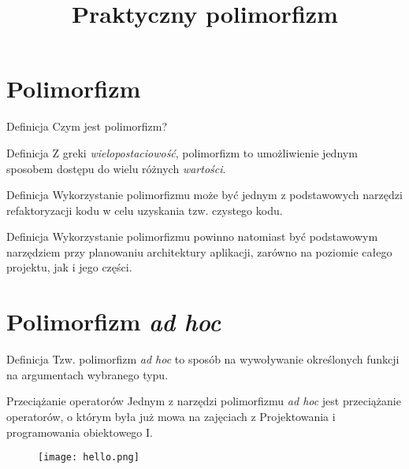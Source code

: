 

\title{Praktyczny polimorfizm}



\section{Polimorfizm}

\begin{frame}{Definicja}
	Czym jest polimorfizm?
\end{frame}

\begin{frame}{Definicja}
	Z greki \emph{wielopostaciowość}, polimorfizm to umożliwienie jednym sposobem dostępu do wielu różnych \emph{wartości}.
\end{frame}

\begin{frame}{Definicja}
	Wykorzystanie polimorfizmu może być jednym z podstawowych narzędzi refaktoryzacji kodu w celu uzyskania tzw. czystego kodu.
\end{frame}

\begin{frame}{Definicja}
	Wykorzystanie polimorfizmu powinno natomiast być podstawowym narzędziem przy planowaniu architektury aplikacji, zarówno na poziomie całego projektu, jak i jego części.
\end{frame}

\section{Polimorfizm \emph{ad hoc}}

\begin{frame}{Definicja}
	Tzw. polimorfizm \emph{ad hoc} to sposób na wywoływanie określonych funkcji na argumentach wybranego typu.
\end{frame}

\begin{frame}{Przeciążanie operatorów}
	Jednym z narzędzi polimorfizmu \emph{ad hoc} jest przeciążanie operatorów, o którym była już mowa na zajęciach z Projektowania i programowania obiektowego I.
\end{frame}

\begin{frame}
	\begin{figure} \centering
		\texttt{[image: hello.png]}
	\end{figure}
\end{frame}

